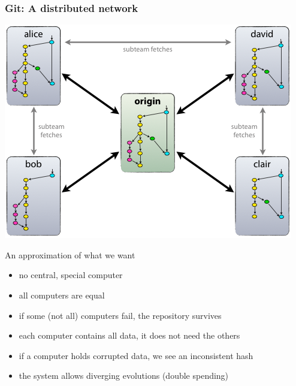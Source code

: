 \documentclass[11pt]{beamer}  %
\begin{document}
\begin{frame}
\end{frame}

\begin{frame}\frametitle{Git: A distributed network}

  \begin{center}
    \includegraphics[scale=0.26,clip=false]{pictures/git_distributed.png}
  \end{center}

  \begin{greenbox}{An approximation of what we want}
    \begin{itemize}
    \item no central, special computer
    \item all computers are equal
    \item if some (not all) computers fail, the repository survives
    \item each computer contains all data, it does not need the others
    \item if a computer holds corrupted data, we see an inconsistent hash
    \item {\color{red}the system allows diverging evolutions (double spending)}
    \end{itemize}
  \end{greenbox}
  
\end{frame}
\end{document}
